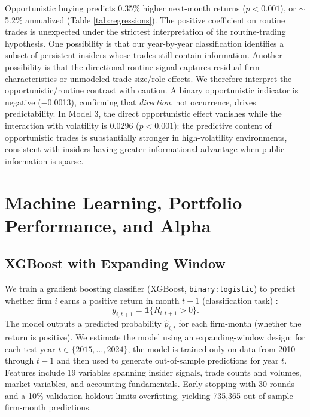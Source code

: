 \documentclass{article}
\begin{document}
\vspace{4pt}

Opportunistic buying predicts 0.35\% higher next-month returns ($p<0.001$), or $\sim$5.2\% annualized (Table \ref{tab:regressions}). 
The positive coefficient on routine trades is unexpected under the strictest interpretation
of the routine-trading hypothesis. One possibility is that our year-by-year classification
identifies a subset of persistent insiders whose trades still contain information. Another
possibility is that the directional routine signal captures residual firm characteristics or
unmodeled trade-size/role effects. We therefore interpret the opportunistic/routine contrast
with caution.
A binary opportunistic indicator is negative ($-$0.0013), confirming that \textit{direction}, not occurrence,  drives predictability. In Model 3, the direct opportunistic effect vanishes while the interaction with volatility is 0.0296 ($p<0.001$): the predictive content of opportunistic trades is substantially stronger in high-volatility environments, consistent with insiders having greater informational advantage when public information is sparse. 

\section{Machine Learning, Portfolio Performance, and Alpha}

\subsection{XGBoost with Expanding Window}

We train a gradient boosting classifier (XGBoost, \texttt{binary:logistic}) to predict whether firm $i$ earns a positive return in month $t+1$ (classification task) :
\[
    y_{i,t+1} = \mathbf{1}\{R_{i,t+1} > 0\}.
\]
The model outputs a predicted probability $\hat{p}_{i,t}$ for each firm-month (whether the return is positive). We estimate the model using an expanding-window design: for each test year $t \in \{2015,\ldots,2024\}$, the model is trained only on data from 2010 through $t-1$ and then used to generate out-of-sample predictions for year $t$. Features include 19 variables spanning insider signals, trade counts and volumes, market variables, and accounting fundamentals. Early stopping with 30 rounds and a 10\% validation holdout limits overfitting, yielding 735,365 out-of-sample firm-month predictions.
\end{document}
